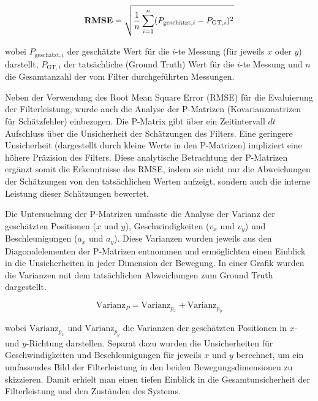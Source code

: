 \documentclass[conference]{IEEEtran}[10pt]
\begin{document}
\[
\text{\textbf{RMSE}} = \sqrt{\frac{1}{n} \sum_{i=1}^{n} (P_{\text{geschätzt},i} - P_{\text{GT},i})^2}
\]

wobei \(P_{\text{geschätzt},i}\) der geschätzte Wert für die \(i\)-te Messung (für jeweils \(x\) oder \(y\)) darstellt, \(P_{\text{GT},i}\) der tatsächliche (Ground Truth) Wert für die \(i\)-te Messung und \(n\) die Gesamtanzahl der vom Filter durchgeführten Messungen.

Neben der Verwendung des Root Mean Square Error (RMSE) für die Evaluierung der Filterleistung, wurde auch die Analyse der P-Matrizen (Kovarianzmatrizen für Schätzfehler) einbezogen. Die P-Matrix gibt über ein Zeitintervall \(dt\) Aufschluss über die Unsicherheit der Schätzungen des Filters. Eine geringere Unsicherheit (dargestellt durch kleine Werte in den P-Matrizen) impliziert eine höhere Präzision des Filters. Diese analytische Betrachtung der P-Matrizen ergänzt somit die Erkenntnisse des RMSE, indem sie nicht nur die Abweichungen der Schätzungen von den tatsächlichen Werten aufzeigt, sondern auch die interne Leistung dieser Schätzungen bewertet.

Die Untersuchung der P-Matrizen umfasste die Analyse der Varianz der geschätzten Positionen (\(x\) und \(y\)), Geschwindigkeiten (\(v_x\) und \(v_y\)) und Beschleunigungen (\(a_x\) und \(a_y\)). Diese Varianzen wurden jeweils aus den Diagonalelementen der P-Matrizen entnommen und ermöglichten einen Einblick in die Unsicherheiten in jeder Dimension der Bewegung. In einer Grafik wurden die Varianzen mit dem tatsächlichen Abweichungen zum Ground Truth dargestellt.

\[
\text{Varianz}_{P} = \text{Varianz}_{p_x} + \text{Varianz}_{p_y}
\]

wobei \(\text{Varianz}_{p_x}\) und \(\text{Varianz}_{p_y}\) die Varianzen der geschätzten Positionen in \(x\)- und \(y\)-Richtung darstellen. Separat dazu wurden die Unsicherheiten für Geschwindigkeiten und Beschleunigungen für jeweils \(x\) und \(y\) berechnet, um ein umfassendes Bild der Filterleistung in den beiden Bewegungsdimensionen zu skizzieren. Damit erhielt man einen tiefen Einblick in die Gesamtunsicherheit der Filterleistung und den Zuständen des Systems.



\end{document}
